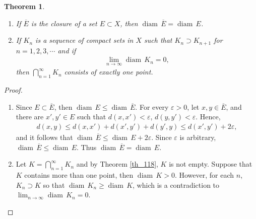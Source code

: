 \documentclass[10pt]{book}
\newtheorem{theorem}{Theorem}[chapter]
\theoremstyle{definition}
\numberwithin{equation}{chapter}
\def\diam{{\operatorname{diam}\,}}
\begin{document}
\medskip

\begin{theorem}\label{th_213}
~\begin{enumerate}[label=(\alph*)]
    \item If $\overline{E}$ is the closure of a set $E \subset X$, then $\diam \overline{E} = \diam E$. \label{th_213_a}
    
    \item If $K_n$ is a sequence of compact sets in $X$ such that $K_n \supset K_{n+1}$ for $n = 1,2,3,\cdots$ and if
    \begin{align*}
        \lim_{n\to\infty} \diam K_n = 0,
    \end{align*}
    then $\bigcap^\infty_{n=1} K_n$ consists of exactly one point. \label{th_213_b}
\end{enumerate}
\end{theorem}
\begin{proof}
~\begin{enumerate}[label=(\alph*)]
    \item Since $E \subset \overline{E}$, then $\diam E \leq \diam \overline{E}$. For every $\varepsilon > 0$, let $x,y \in \overline{E}$, and there are $x',y' \in E$ such that $d(x,x') < \varepsilon$, $d(y,y') < \varepsilon$. Hence, 
    \begin{align*}
        d(x,y) \leq d(x,x') + d(x',y') + d(y',y) \leq d(x',y') + 2 \varepsilon,
    \end{align*}
    and it follows that $\diam \overline{E} \leq \diam E + 2 \varepsilon$. Since $\varepsilon$ is arbitrary, $\diam \overline{E} \leq \diam E$. Thus $\diam \overline{E} = \diam E$.
    
    \item Let $K = \bigcap^\infty_{n=1} K_n$ and by Theorem \ref{th_118}, $K$ is not empty. Suppose that $K$ contains more than one point, then $\diam K > 0$. However, for each $n$, $K_n \supset K$ so that $\diam K_n \geq \diam K$, which is a contradiction to $\lim_{n\to\infty} \diam K_n = 0$. 
\end{enumerate}
\end{proof}

\medskip
\end{document}
